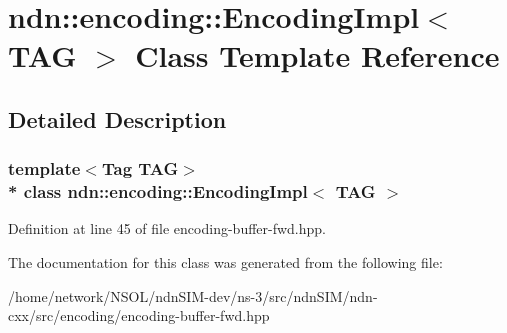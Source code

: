 \hypertarget{classndn_1_1encoding_1_1EncodingImpl}{}\section{ndn\+:\+:encoding\+:\+:Encoding\+Impl$<$ T\+AG $>$ Class Template Reference}
\label{classndn_1_1encoding_1_1EncodingImpl}


\subsection{Detailed Description}
\subsubsection*{template$<$Tag T\+AG$>$\\*
class ndn\+::encoding\+::\+Encoding\+Impl$<$ T\+A\+G $>$}



Definition at line 45 of file encoding-\/buffer-\/fwd.\+hpp.



The documentation for this class was generated from the following file\+:\begin{DoxyCompactItemize}
\item 
/home/network/\+N\+S\+O\+L/ndn\+S\+I\+M-\/dev/ns-\/3/src/ndn\+S\+I\+M/ndn-\/cxx/src/encoding/encoding-\/buffer-\/fwd.\+hpp\end{DoxyCompactItemize}
